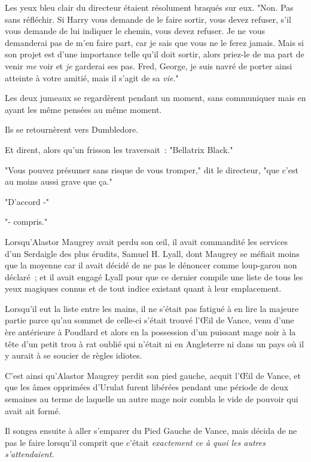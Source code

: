 Les yeux bleu clair du directeur étaient résolument braqués sur eux. "Non. Pas sans réfléchir. Si Harry vous demande de le faire sortir, vous devez refuser, s'il vous demande de lui indiquer le chemin, vous devez refuser. Je ne vous demanderai pas de m'en faire part, car je sais que vous ne le ferez jamais. Mais si son projet est d'une importance telle qu'il doit sortir, alors priez-le de ma part de venir \emph{me} voir et \emph{je} garderai ses pas. Fred, George, je suis navré de porter ainsi atteinte à votre amitié, mais il s'agit de sa \emph{vie}."

Les deux jumeaux se regardèrent pendant un moment, sans communiquer mais en ayant les même pensées au même moment.

Ils se retournèrent vers Dumbledore.

Et dirent, alors qu'un frisson les traversait~: "Bellatrix Black."

"Vous pouvez présumer sans risque de vous tromper," dit le directeur, "que c'est au moins aussi grave que ça."

"D'accord -"

"- compris."


Lorsqu'Alastor Maugrey avait perdu son œil, il avait commandité les services d'un Serdaigle des plus érudits, Samuel H. Lyall, dont Maugrey se méfiait moins que la moyenne car il avait décidé de ne pas le dénoncer comme loup-garou non déclaré~; et il avait engagé Lyall pour que ce dernier compile une liste de tous les yeux magiques connus et de tout indice existant quant à leur emplacement.

Lorsqu'il eut la liste entre les mains, il ne s'était pas fatigué à en lire la majeure partie parce qu'au sommet de celle-ci s'était trouvé l'Œil de Vance, venu d'une ère antérieure à Poudlard et alors en la possession d'un puissant mage noir à la tête d'un petit trou à rat oublié qui n'était ni en Angleterre ni dans un pays où il y aurait à se soucier de règles idiotes.

C'est ainsi qu'Alastor Maugrey perdit son pied gauche, acquit l'Œil de Vance, et que les âmes opprimées d'Urulat furent libérées pendant une période de deux semaines au terme de laquelle un autre mage noir combla le vide de pouvoir qui avait ait formé.

Il songea ensuite à aller s'emparer du Pied Gauche de Vance, mais décida de ne pas le faire lorsqu'il comprit que c'était \emph{exactement ce à quoi les autres s'attendaient.}

